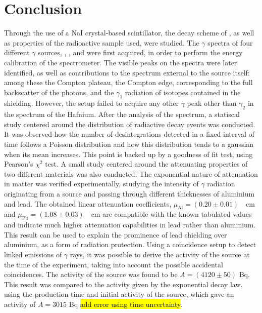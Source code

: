 \section{Conclusion}
Through the use of a NaI crystal-based scintillator, the decay scheme of \cobalt, as well as properties of the radioactive sample used, were studied.
The $\gamma$ spectra of four different $\gamma$ sources, \cesium, \cobalt, \lead and \hafnium were first acquired, in order to perform the energy calibration of the spectrometer.
The visible peaks on the spectra were later identified, as well as contributions to the spectrum external to the source itself:
among these the Compton plateau, the Compton edge, corresponding to the full backscatter of the photons, and the $\gamma_1$ radiation of \lead isotopes contained in the shielding.
However, the setup failed to acquire any other $\gamma$ peak other than $\gamma_2$ in the spectrum of the Hafnium.
After the analysis of the spectrum, a statiscal study centered around the distribution of radiactive decay events was conducted.
It was observed how the number of desintegrations detected in a fixed interval of time follows a Poisson distribution and how this distribution tends to a gaussian when its mean increases.
This point is backed up by a goodness of fit test, using Pearson's \(\chi^2\) test.
A small study centered around the attenuating properties of two different materials was also conducted.
The exponential nature of attenuation in matter was verified experimentally, studying the intensity of $\gamma$ radiation originating from a \cesium source and passing through different thicknesses of aluminium and lead.
The obtained linear attenuation coefficients, \mbox{$\mu_{\mathrm{Al}} = (0.20 \pm 0.01)$ \unit{\per\cm}} and \mbox{$\mu_{\mathrm{Pb}} = (1.08 \pm 0.03)$ \unit{\per\cm}} are compatible with the known tabulated values and indicate much higher attenuation capabilities in lead rather than aluminium.
This result can be used to explain the prominence of lead shielding over aluminium, as a form of radiation protection.
Using a coincidence setup to detect linked emissions of \(\gamma\) rays, it was possible to derive the activity of the \cobalt source at the time of the experiment, taking into account the possible accidental coincidences.
The activity of the source was found to be $A = (4120 \pm 50)$ Bq.
This result was compared to the activity given by the exponential decay law, using the production time and initial activity of the source, which gave an activity of \(A = 3015\) Bq \hl{add error using time uncertainty}.
